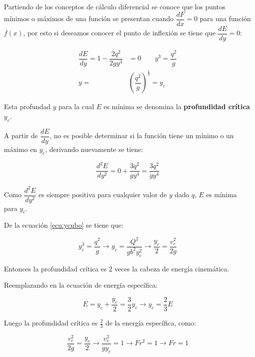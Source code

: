 \documentclass[11pt, oneside]{article}
\begin{document}
Partiendo de los conceptos de cálculo diferencial se conoce que los puntos mínimos o máximos de una función se presentan cuando $\dfrac{dF}{dx}=0$ para una función $f(x)$, por esto si deseamos conocer el punto de inflexión se tiene que $\dfrac{dE}{dy}=0$:

\begin{equation}
    \begin{aligned}
       \dfrac{dE}{dy}=1-\dfrac{2q^{2}}{2gy^{3}}&=0 \qquad y^{3}=\dfrac{q^{2}}{g} \\
       y=&\left(\dfrac{q^{2}}{g}\right)^{\frac{1}{3}}=y_c
    \end{aligned}
    \label{ecu:ycubo}
\end{equation}

Esta profundad $y$ para la cual $E$ es mínima se denomina la \textbf{profundidad crítica} $y_c$. \vspace{1ex}

A partir de $\dfrac{dE}{dy}$, no es posible determinar si la función tiene un mínimo o un máximo en $y_c$, derivando nuevamente se tiene:

\begin{equation}
    \dfrac{d^{2}E}{dy^{2}}=0+\dfrac{3q^{2}}{gy^{4}}=\dfrac{3q^{2}}{gy^{4}}
\end{equation}

Como $\dfrac{d^{2}E}{dy^{2}}$ es siempre positiva para cualquier valor de $y$ dado $q$, $E$ es mínima para $y_c$. \vspace{1ex}

De la ecuación \ref{ecu:ycubo} se tiene que:

\begin{equation}
    y_{c}^{3}=\dfrac{q^{2}}{g}\rightarrow y_{c}=\dfrac{Q^{2}}{gb^{2}y_{c}^{2}} \rightarrow \dfrac{y_{c}}{2}=\dfrac{v_c^{2}}{2g}
\end{equation}

Entonces la profundidad crítica es 2 veces la cabeza de energía cinemática.

Reemplazando en la ecuación de energía específica:

\begin{equation}
    E=y_{c}+\dfrac{y_{c}}{2}=\dfrac{3}{2}y_{c}\rightarrow y_{c}=\dfrac{2}{3}E
\end{equation}

Luego la profundidad crítica es $\frac{2}{3}$ de la energía específica, como:

\begin{equation}
    \dfrac{v_c^{2}}{2g}=\dfrac{y_{c}}{2}\rightarrow\dfrac{v_c^{2}}{gy_{c}}=1 \rightarrow Fr^{2}=1 \rightarrow Fr=1
\end{equation}
\end{document}
